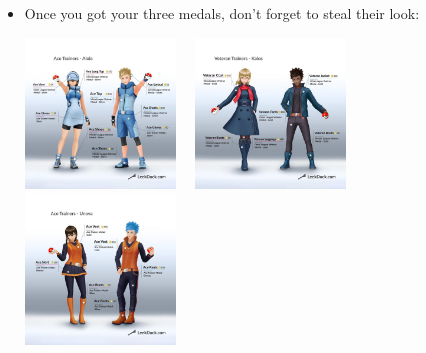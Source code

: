 \documentclass[12pt]{beamer}
\renewcommand{\baselinestretch}{1.1}
\begin{document}
\begin{frame}
\begin{block}{}
\begin{footnotesize}
\begin{itemize}

\item Once you got your three medals, don't forget to steal their look:

\begin{center}
\includegraphics[width=4cm]{../../outfit/Alola_Ace_Trainer_2.jpg}~~
\includegraphics[width=4cm]{../../outfit/Kalos_Veteran_2.jpg}~~
\includegraphics[width=4cm]{../../outfit/Unova_Ace_Trainer_2.jpg}
\end{center}
\end{itemize}
\end{footnotesize}
\end{block}

\end{frame}


\renewcommand{\baselinestretch}{1.1}
\end{document}
